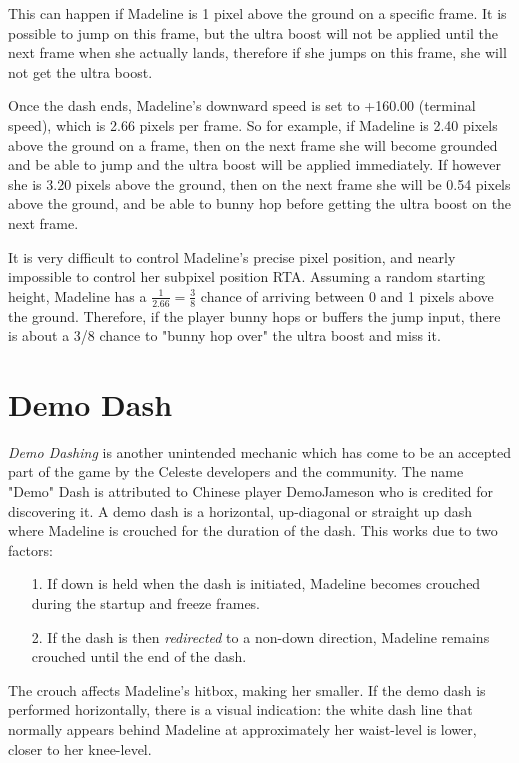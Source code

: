 \documentclass[oneside]{book}
\begin{document}
This can happen if Madeline is 1 pixel above the ground on a specific frame. It is possible to jump on this frame, but the ultra boost will not be applied until the next frame when she actually lands, therefore if she jumps on this frame, she will not get the ultra boost.

Once the dash ends, Madeline's downward speed is set to +160.00 (terminal speed), which is 2.66 pixels per frame. So for example, if Madeline is 2.40 pixels above the ground on a frame, then on the next frame she will become grounded and be able to jump and the ultra boost will be applied immediately. If however she is 3.20 pixels above the ground, then on the next frame she will be 0.54 pixels above the ground, and be able to bunny hop before getting the ultra boost on the next frame.

It is very difficult to control Madeline's precise pixel position, and nearly impossible to control her subpixel position RTA. Assuming a random starting height, Madeline has a $\frac{1}{2.66}=\frac{3}{8}$ chance of arriving between 0 and 1 pixels above the ground. Therefore, if the player bunny hops or buffers the jump input, there is about a 3/8 chance to "bunny hop over" the ultra boost and miss it.

\section{Demo Dash}

\textit{Demo Dashing} is another unintended mechanic which has come to be an accepted part of the game by the Celeste developers and the community. The name "Demo" Dash is attributed to Chinese player DemoJameson who is credited for discovering it. A demo dash is a horizontal, up-diagonal or straight up dash where Madeline is crouched for the duration of the dash. This works due to two factors:

\begin{itemize}
\item[1.]If down is held when the dash is initiated, Madeline becomes crouched during the startup and freeze frames.
\item[2.]If the dash is then \textit{redirected} to a non-down direction, Madeline remains crouched until the end of the dash.
\end{itemize}

The crouch affects Madeline's hitbox, making her smaller. If the demo dash is performed horizontally, there is a visual indication: the white dash line that normally appears behind Madeline at approximately her waist-level is lower, closer to her knee-level.
\end{document}
